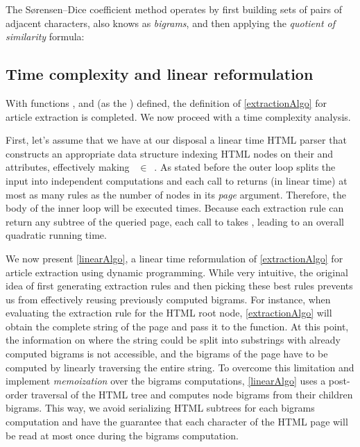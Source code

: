 The Sørensen–Dice coefficient method operates by first building sets of pairs of adjacent characters, also knows as \emph{bigrams}, and then applying the \emph{quotient of similarity} formula:

\similarityAlgo


\subsection{Time complexity and linear reformulation}
\label{timecomplexityandlinearreformulation}

With functions ,  and  (as the ) defined, the definition of \autoref{extractionAlgo} for article extraction is completed. We now proceed with a time complexity analysis.

First, let's assume that we have at our disposal a linear time HTML parser that constructs an appropriate data structure indexing HTML nodes on their  and  attributes, effectively making ~$\in$~. As stated before the outer loop splits the input into independent computations and each call to  returns (in linear time) at most as many rules as the number of nodes in its \emph{page} argument. Therefore, the body of the inner loop will be executed  times. Because each extraction rule can return any subtree of the queried page, each call to  takes , leading to an overall quadratic running time.

We now present \autoref{linearAlgo}, a linear time reformulation of \autoref{extractionAlgo} for article extraction using dynamic programming. While very intuitive, the original idea of first generating extraction rules and then picking these best rules prevents us from effectively reusing previously computed bigrams. For instance, when evaluating the extraction rule for the HTML root node, \autoref{extractionAlgo} will obtain the complete string of the page and pass it to the  function. At this point, the information on where the string could be split into substrings with already computed bigrams is not accessible, and the bigrams of the page have to be computed by linearly traversing the entire string. To overcome this limitation and implement \emph{memoization} over the bigrams computations, \autoref{linearAlgo} uses a post-order traversal of the HTML tree and computes node bigrams from their children bigrams. This way, we avoid serializing HTML subtrees for each bigrams computation and have the guarantee that each character of the HTML page will be read at most once during the bigrams computation.

